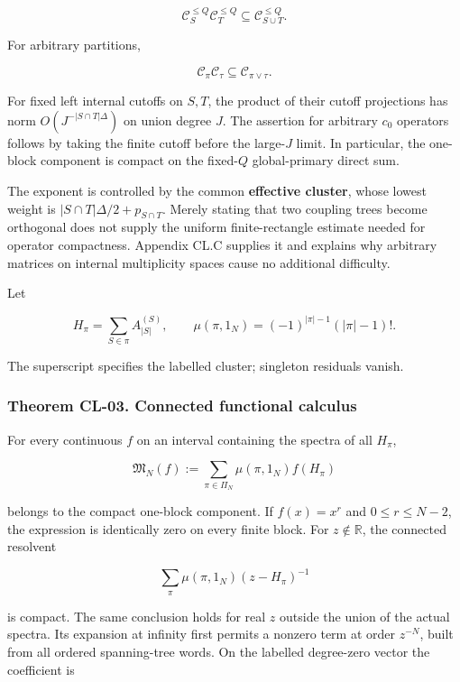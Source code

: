 \documentclass[a4paper,11pt]{article}
\numberwithin{equation}{section}
\begin{document}
\[
\mathcal C_S^{\leq Q}\mathcal C_T^{\leq Q}
\subseteq\mathcal C_{S\cup T}^{\leq Q}.
\]

For arbitrary partitions,

\[
\mathcal C_\pi\mathcal C_\tau\subseteq\mathcal C_{\pi\vee\tau}.
\tag{CL.6}
\]

For fixed left internal cutoffs on \(S,T\), the product of their cutoff projections has norm \(O(J^{-|S\cap T|\Delta})\) on union degree \(J\). The assertion for arbitrary \(c_0\) operators follows by taking the finite cutoff before the large-\(J\) limit. In particular, the one-block component is compact on the fixed-\(Q\) global-primary direct sum.

The exponent is controlled by the common \textbf{effective cluster}, whose lowest weight is \(|S\cap T|\Delta/2+p_{S\cap T}\). Merely stating that two coupling trees become orthogonal does not supply the uniform finite-rectangle estimate needed for operator compactness. Appendix CL.C supplies it and explains why arbitrary matrices on internal multiplicity spaces cause no additional difficulty.

Let

\[
H_\pi=\sum_{S\in\pi}A_{|S|}^{(S)},\qquad
\mu(\pi,1_N)=(-1)^{|\pi|-1}(|\pi|-1)!.
\]

The superscript specifies the labelled cluster; singleton residuals vanish.

\hypertarget{theorem-cl-03.-connected-functional-calculus}{%
\subsubsection{Theorem CL-03. Connected functional calculus}\label{theorem-cl-03.-connected-functional-calculus}}

For every continuous \(f\) on an interval containing the spectra of all \(H_\pi\),

\[
\mathfrak M_N(f):=
\sum_{\pi\in\Pi_N}\mu(\pi,1_N)f(H_\pi)
\tag{CL.7}
\]

belongs to the compact one-block component. If \(f(x)=x^r\) and \(0\leq r\leq N-2\), the expression is identically zero on every finite block. For \(z\notin\mathbb R\), the connected resolvent

\[
\sum_\pi\mu(\pi,1_N)(z-H_\pi)^{-1}
\]

is compact. The same conclusion holds for real \(z\) outside the union of the actual spectra. Its expansion at infinity first permits a nonzero term at order \(z^{-N}\), built from all ordered spanning-tree words. On the labelled degree-zero vector the coefficient is
\end{document}
